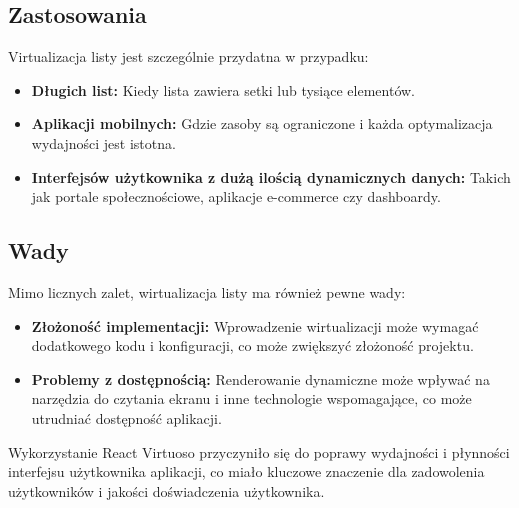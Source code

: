 \subsection*{Zastosowania}
Virtualizacja listy jest szczególnie przydatna w przypadku:
\begin{itemize}
    \item \textbf{Długich list:} Kiedy lista zawiera setki lub tysiące elementów.
    \item \textbf{Aplikacji mobilnych:} Gdzie zasoby są ograniczone i każda optymalizacja wydajności jest istotna.
    \item \textbf{Interfejsów użytkownika z dużą ilością dynamicznych danych:} Takich jak portale społecznościowe, aplikacje e-commerce czy dashboardy.
\end{itemize}

\subsection*{Wady}
Mimo licznych zalet, wirtualizacja listy ma również pewne wady:
\begin{itemize}
    \item \textbf{Złożoność implementacji:} Wprowadzenie wirtualizacji może wymagać dodatkowego kodu i konfiguracji, co może zwiększyć złożoność projektu.
    \item \textbf{Problemy z dostępnością:} Renderowanie dynamiczne może wpływać na narzędzia do czytania ekranu i inne technologie wspomagające, co może utrudniać dostępność aplikacji.
\end{itemize}

Wykorzystanie React Virtuoso przyczyniło się do poprawy wydajności i płynności interfejsu użytkownika  aplikacji, co miało kluczowe znaczenie dla zadowolenia użytkowników i jakości doświadczenia użytkownika.





